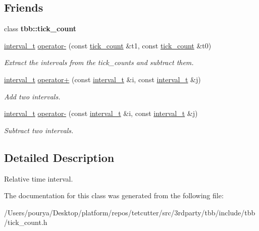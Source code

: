 \subsection*{Friends}
\begin{DoxyCompactItemize}
\item 
\hypertarget{classtbb_1_1tick__count_1_1interval__t_a68e741a8f6e2384027e93d1f654ad100}{}class {\bfseries tbb\+::tick\+\_\+count}\label{classtbb_1_1tick__count_1_1interval__t_a68e741a8f6e2384027e93d1f654ad100}

\item 
\hypertarget{classtbb_1_1tick__count_1_1interval__t_ab5ceaed3ebf5a0d41088a5bc7c8dc653}{}\hyperlink{classtbb_1_1tick__count_1_1interval__t}{interval\+\_\+t} \hyperlink{classtbb_1_1tick__count_1_1interval__t_ab5ceaed3ebf5a0d41088a5bc7c8dc653}{operator-\/} (const \hyperlink{classtbb_1_1tick__count}{tick\+\_\+count} \&t1, const \hyperlink{classtbb_1_1tick__count}{tick\+\_\+count} \&t0)\label{classtbb_1_1tick__count_1_1interval__t_ab5ceaed3ebf5a0d41088a5bc7c8dc653}

\begin{DoxyCompactList}\small\item\em Extract the intervals from the tick\+\_\+counts and subtract them. \end{DoxyCompactList}\item 
\hypertarget{classtbb_1_1tick__count_1_1interval__t_ac8910ee3b69f68eb905af787c273e9a8}{}\hyperlink{classtbb_1_1tick__count_1_1interval__t}{interval\+\_\+t} \hyperlink{classtbb_1_1tick__count_1_1interval__t_ac8910ee3b69f68eb905af787c273e9a8}{operator+} (const \hyperlink{classtbb_1_1tick__count_1_1interval__t}{interval\+\_\+t} \&i, const \hyperlink{classtbb_1_1tick__count_1_1interval__t}{interval\+\_\+t} \&j)\label{classtbb_1_1tick__count_1_1interval__t_ac8910ee3b69f68eb905af787c273e9a8}

\begin{DoxyCompactList}\small\item\em Add two intervals. \end{DoxyCompactList}\item 
\hypertarget{classtbb_1_1tick__count_1_1interval__t_a3d11133daa9a7d3c903d070293278f8f}{}\hyperlink{classtbb_1_1tick__count_1_1interval__t}{interval\+\_\+t} \hyperlink{classtbb_1_1tick__count_1_1interval__t_a3d11133daa9a7d3c903d070293278f8f}{operator-\/} (const \hyperlink{classtbb_1_1tick__count_1_1interval__t}{interval\+\_\+t} \&i, const \hyperlink{classtbb_1_1tick__count_1_1interval__t}{interval\+\_\+t} \&j)\label{classtbb_1_1tick__count_1_1interval__t_a3d11133daa9a7d3c903d070293278f8f}

\begin{DoxyCompactList}\small\item\em Subtract two intervals. \end{DoxyCompactList}\end{DoxyCompactItemize}


\subsection{Detailed Description}
Relative time interval. 

The documentation for this class was generated from the following file\+:\begin{DoxyCompactItemize}
\item 
/\+Users/pourya/\+Desktop/platform/repos/tetcutter/src/3rdparty/tbb/include/tbb/tick\+\_\+count.\+h\end{DoxyCompactItemize}
